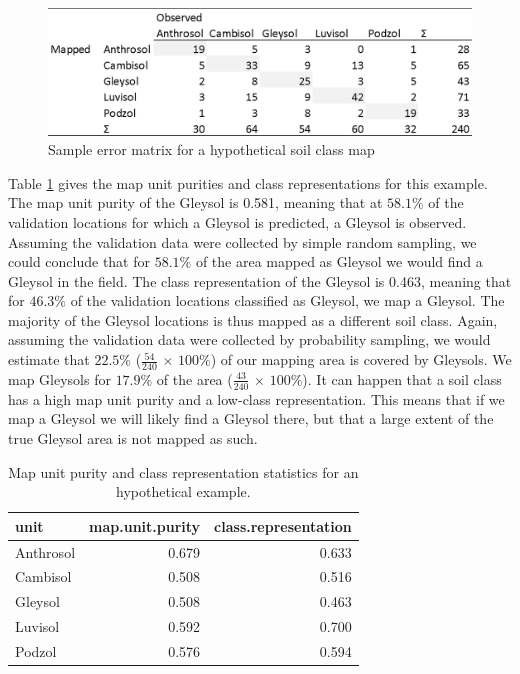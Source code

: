\documentclass[10pt,b5paper,]{book}
\theoremstyle{definition}
\theoremstyle{definition}
\theoremstyle{definition}
\theoremstyle{remark}
\begin{document}
\begin{figure}

{\centering \includegraphics[width=0.8\linewidth]{images/Validation_error_matrix2} 

}

\caption{Sample error matrix for a hypothetical soil class map}\label{fig:errormatrix2}
\end{figure}

Table \ref{tab:purity} gives the map unit purities and class
representations for this example. The map unit purity of the Gleysol is
0.581, meaning that at \(58.1\%\) of the validation locations for which
a Gleysol is predicted, a Gleysol is observed. Assuming the validation
data were collected by simple random sampling, we could conclude that
for \(58.1\%\) of the area mapped as Gleysol we would find a Gleysol in
the field. The class representation of the Gleysol is 0.463, meaning
that for \(46.3\%\) of the validation locations classified as Gleysol,
we map a Gleysol. The majority of the Gleysol locations is thus mapped
as a different soil class. Again, assuming the validation data were
collected by probability sampling, we would estimate that \(22.5\%\)
(\(\frac{54}{240}\) \(\times\) \(100\%\)) of our mapping area is covered
by Gleysols. We map Gleysols for \(17.9\%\) of the area
(\(\frac{43}{240}\) \(\times\) \(100\%\)). It can happen that a soil
class has a high map unit purity and a low-class representation. This
means that if we map a Gleysol we will likely find a Gleysol there, but
that a large extent of the true Gleysol area is not mapped as such.

\begin{table}

\caption{\label{tab:purity}Map unit purity and class representation statistics for an hypothetical example.}
\centering
\begin{tabular}[t]{lrr}
\toprule
unit & map.unit.purity & class.representation\\
\midrule
Anthrosol & 0.679 & 0.633\\
Cambisol & 0.508 & 0.516\\
Gleysol & 0.508 & 0.463\\
Luvisol & 0.592 & 0.700\\
Podzol & 0.576 & 0.594\\
\bottomrule
\end{tabular}
\end{table}
\end{document}
